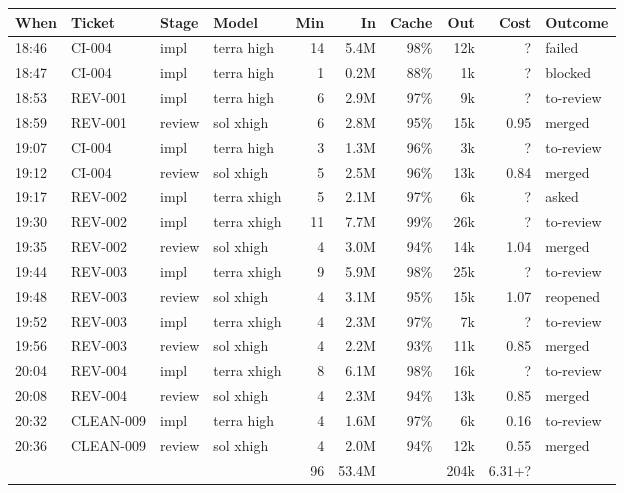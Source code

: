 \documentclass[11pt,a4paper]{article}
\begin{document}
{\small
\begin{tabularx}{\linewidth}{@{}llllrrrrrX@{}}
\toprule
When & Ticket & Stage & Model & Min & In & Cache & Out & Cost & Outcome \\
\midrule
18:46 & CI-004 & impl & terra high & 14 & 5.4M & 98\% & 12k & ? & failed \\
18:47 & CI-004 & impl & terra high & 1 & 0.2M & 88\% & 1k & ? & blocked \\
18:53 & REV-001 & impl & terra high & 6 & 2.9M & 97\% & 9k & ? & to-review \\
18:59 & REV-001 & review & sol xhigh & 6 & 2.8M & 95\% & 15k & 0.95 & merged \\
19:07 & CI-004 & impl & terra high & 3 & 1.3M & 96\% & 3k & ? & to-review \\
19:12 & CI-004 & review & sol xhigh & 5 & 2.5M & 96\% & 13k & 0.84 & merged \\
19:17 & REV-002 & impl & terra xhigh & 5 & 2.1M & 97\% & 6k & ? & asked \\
19:30 & REV-002 & impl & terra xhigh & 11 & 7.7M & 99\% & 26k & ? & to-review \\
19:35 & REV-002 & review & sol xhigh & 4 & 3.0M & 94\% & 14k & 1.04 & merged \\
19:44 & REV-003 & impl & terra xhigh & 9 & 5.9M & 98\% & 25k & ? & to-review \\
19:48 & REV-003 & review & sol xhigh & 4 & 3.1M & 95\% & 15k & 1.07 & reopened \\
19:52 & REV-003 & impl & terra xhigh & 4 & 2.3M & 97\% & 7k & ? & to-review \\
19:56 & REV-003 & review & sol xhigh & 4 & 2.2M & 93\% & 11k & 0.85 & merged \\
20:04 & REV-004 & impl & terra xhigh & 8 & 6.1M & 98\% & 16k & ? & to-review \\
20:08 & REV-004 & review & sol xhigh & 4 & 2.3M & 94\% & 13k & 0.85 & merged \\
20:32 & CLEAN-009 & impl & terra high & 4 & 1.6M & 97\% & 6k & 0.16 & to-review \\
20:36 & CLEAN-009 & review & sol xhigh & 4 & 2.0M & 94\% & 12k & 0.55 & merged \\
\midrule
 & & & & 96 & 53.4M & & 204k & 6.31+? & \\
\bottomrule
\end{tabularx}
}
\end{document}
